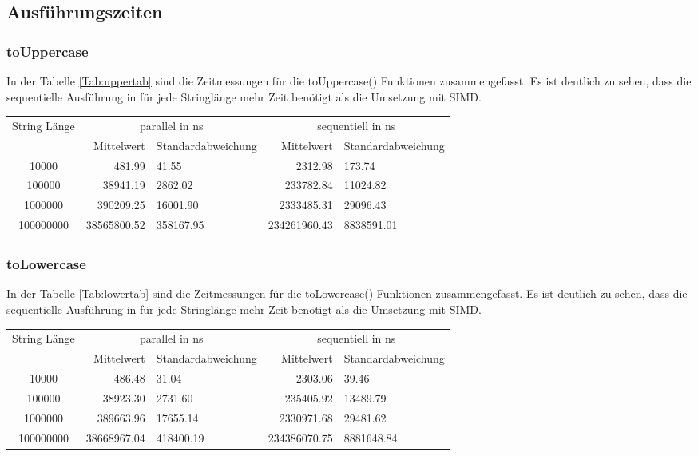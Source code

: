 \documentclass[plainarticle,zihtitle,german,final,hyperref,utf8]{zihpub}
\begin{document}
\subsection{Ausführungszeiten}
\subsubsection{toUppercase}
In der Tabelle \ref{Tab:uppertab} sind die Zeitmessungen für die toUppercase() Funktionen zusammengefasst.
Es ist deutlich zu sehen, dass die se­quen­ti­elle Ausführung in für jede Stringlänge mehr Zeit benötigt als die Umsetzung mit SIMD.
\newline
\begin{tabular}{|c|r|l|r|l|}
	\hline
	\multicolumn{1}{|c|}{String Länge} & \multicolumn{2}{c|}{parallel in ns} & \multicolumn{2}{c|}{se­quen­tiell­ in ns} \\
	\cline{2-5}
	& Mittelwert & Standardabweichung  & Mittelwert & Standardabweichung \\
	\hline
	10000 & 481.99 & 41.55 & 2312.98 & 173.74 \\
	100000 & 38941.19 & 2862.02 & 233782.84 & 11024.82 \\
	1000000 & 390209.25 & 16001.90 & 2333485.31 & 29096.43 \\
	100000000 & 38565800.52 & 358167.95 & 234261960.43 & 8838591.01 \\
	\hline
\end{tabular}
\label{Tab:uppertab}


\subsubsection{toLowercase}
In der Tabelle \ref{Tab:lowertab} sind die Zeitmessungen für die toLowercase() Funktionen zusammengefasst.
Es ist deutlich zu sehen, dass die sequentielle Ausführung in für jede Stringlänge mehr Zeit benötigt als die Umsetzung mit SIMD.
\newline
\begin{tabular}{|c|r|l|r|l|}
	\hline
	\multicolumn{1}{|c|}{String Länge} & \multicolumn{2}{c|}{parallel in ns} & \multicolumn{2}{c|}{sequentiell in ns} \\
	\cline{2-5}
	& Mittelwert & Standardabweichung  & Mittelwert & Standardabweichung \\
	\hline
	10000 & 486.48 & 31.04 & 2303.06 & 39.46 \\
	100000 & 38923.30 & 2731.60 & 235405.92 & 13489.79 \\
	1000000 & 389663.96 & 17655.14 & 2330971.68 & 29481.62 \\
	100000000 & 38668967.04 & 418400.19 & 234386070.75 & 8881648.84 \\
	\hline
\end{tabular}
\label{Tab:lowertab}
\end{document}
